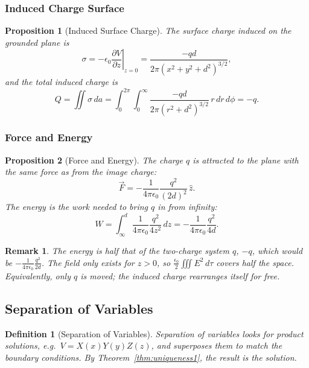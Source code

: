 \documentclass{article}
\newtheorem{definition}{Definition}
\newtheorem{remark}{Remark}
\newtheorem{proposition}{Proposition}
\begin{document}
\subsubsection{Induced Charge Surface}
\begin{proposition}[Induced Surface Charge]
    The surface charge induced on the grounded plane is
    \[\sigma = -\epsilon_0\left.\frac{\partial V}{\partial z}\right|_{z=0} = \frac{-qd}{2\pi\left(x^2+y^2+d^2\right)^{3/2}},\]
    and the total induced charge is
    \[Q = \iint \sigma\,da = \int_0^{2\pi}\!\!\int_0^\infty \frac{-qd}{2\pi\left(r^2+d^2\right)^{3/2}}\,r\,dr\,d\phi = -q.\]
\end{proposition}

\subsubsection{Force and Energy}
\begin{proposition}[Force and Energy]
    The charge $q$ is attracted to the plane with the same force as from the image charge:
    \[\vec{F} = -\frac{1}{4\pi\epsilon_0}\frac{q^2}{(2d)^2}\,\hat{z}.\]
    The energy is the work needed to bring $q$ in from infinity:
    \[W = \int_\infty^d \frac{1}{4\pi\epsilon_0}\frac{q^2}{4z^2}\,dz = -\frac{1}{4\pi\epsilon_0}\frac{q^2}{4d}.\]
\end{proposition}
\begin{remark}
    The energy is half that of the two-charge system $q$, $-q$, which would be $-\frac{1}{4\pi\epsilon_0}\frac{q^2}{2d}$. The field only exists for $z>0$, so $\frac{\epsilon_0}{2}\iiint E^2\,d\tau$ covers half the space. Equivalently, only $q$ is moved; the induced charge rearranges itself for free.
\end{remark}

\subsection{Separation of Variables}
\begin{definition}[Separation of Variables]
    Separation of variables looks for product solutions, e.g.\ $V = X(x)Y(y)Z(z)$, and superposes them to match the boundary conditions. By Theorem~\ref{thm:uniqueness1}, the result is the solution.
\end{definition}
\end{document}
